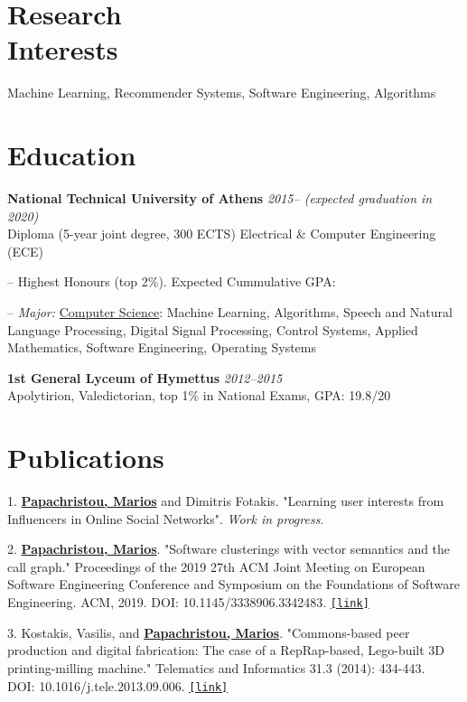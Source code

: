 \documentclass[margin]{res}
\newcommand{\field}[2]{\noindent \textbf{#1} \hfill #2 \\}
\begin{document}
\begin{resume}

\section{Research \\ Interests} Machine Learning, Recommender Systems, Software Engineering, Algorithms

\section{Education}
\field{National Technical University of Athens}  {\emph{2015-- (expected graduation in 2020)}} 
Diploma (5-year joint degree, 300 ECTS) Electrical \& Computer Engineering (ECE)
\begin{compactitem}
\item[--] Highest Honours (top 2\%). Expected Cummulative GPA:   
\item[--] \emph{Major:} \underline{Computer Science}: Machine Learning, Algorithms, Speech and Natural Language Processing, Digital Signal Processing, Control Systems, Applied Mathematics, Software Engineering, Operating Systems 
\end{compactitem} 
\field{1st General Lyceum of Hymettus} {\emph{2012--2015}} 
Apolytirion, Valedictorian, top 1\% in National Exams, GPA: 19.8/20


\section{Publications}

\begin{compactitem}
	\item[1.] \underline{\textbf{Papachristou, Marios}} and Dimitris Fotakis. "Learning user interests from Influencers in Online Social Networks". \emph{Work in progress}. 
    \item[2.] \underline{\textbf{Papachristou, Marios}}. "Software clusterings with vector semantics and the call graph." Proceedings of the 2019 27th ACM Joint Meeting on European Software Engineering Conference and Symposium on the Foundations of Software Engineering. ACM, 2019. DOI: 10.1145/3338906.3342483. \href{https://dl.acm.org/citation.cfm?id=3342483}{\nolinkurl{[link]}}
    \item[3.] Kostakis, Vasilis, and \underline{\textbf{Papachristou, Marios}}. "Commons-based peer production and digital fabrication: The case of a RepRap-based, Lego-built 3D printing-milling machine." Telematics and Informatics 31.3 (2014): 434-443. \\ DOI: 10.1016/j.tele.2013.09.006. \href{https://bit.ly/2JRoisV}{\nolinkurl{[link]}} \end{compactitem}



\end{resume}
\end{document}
